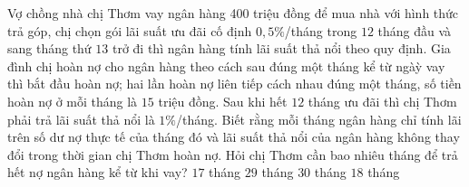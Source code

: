\begin{ex}%
	Vợ chồng nhà chị Thơm vay ngân hàng 400 triệu đồng để mua nhà với hình thức trả góp, chị chọn gói lãi suất ưu đãi cố định $ 0{,}5\% $/tháng trong $ 12 $ tháng đầu và sang tháng thứ $ 13 $ trở  đi thì ngân hàng tính lãi suất thả nổi theo quy định. Gia đình chị hoàn nợ cho ngân hàng theo cách sau đúng một tháng kể từ ngàỳ vay thì bắt đầu hoàn nợ; hai lần hoàn nợ liên tiếp cách nhau đúng một tháng, số tiền hoàn nợ ở mỗi tháng là $ 15 $ triệu đồng. Sau khi hết $ 12 $ tháng ưu đãi thì chị Thơm phải trả lãi suất thả nổi là $ 1\% $/tháng. Biết rằng mỗi tháng ngân hàng chỉ tính lãi trên số dư nợ thực tế của tháng đó và lãi suất thả nổi của ngân hàng không thay đổi trong thời gian chị Thơm hoàn nợ. Hỏi chị Thơm cần bao nhiêu tháng để trả hết nợ ngân hàng kể từ khi vay?
	\choice 
		 {$17$ tháng}
		{$29$ tháng} 
		 {\True $30$ tháng}
		{$18$ tháng} 
\end{ex}

